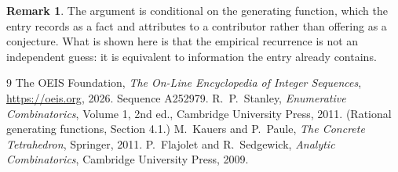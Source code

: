 \documentclass[11pt,a4paper]{article}
\theoremstyle{plain}
\theoremstyle{definition}
\newtheorem{remark}[theorem]{Remark}
\begin{document}
\begin{remark}
The argument is conditional on the generating function, which the entry records as a fact and
attributes to a contributor rather than offering as a conjecture. What is shown here is that
the empirical recurrence is not an independent guess: it is equivalent to information the
entry already contains.
\end{remark}

\begin{thebibliography}{9}
 The OEIS Foundation, \emph{The On-Line Encyclopedia of Integer
Sequences}, \url{https://oeis.org}, 2026. Sequence A252979.
 R.~P.~Stanley, \emph{Enumerative Combinatorics}, Volume 1, 2nd ed.,
Cambridge University Press, 2011. (Rational generating functions, Section 4.1.)
 M.~Kauers and P.~Paule, \emph{The Concrete Tetrahedron}, Springer, 2011.
 P.~Flajolet and R.~Sedgewick, \emph{Analytic Combinatorics}, Cambridge
University Press, 2009.
\end{thebibliography}
\end{document}
